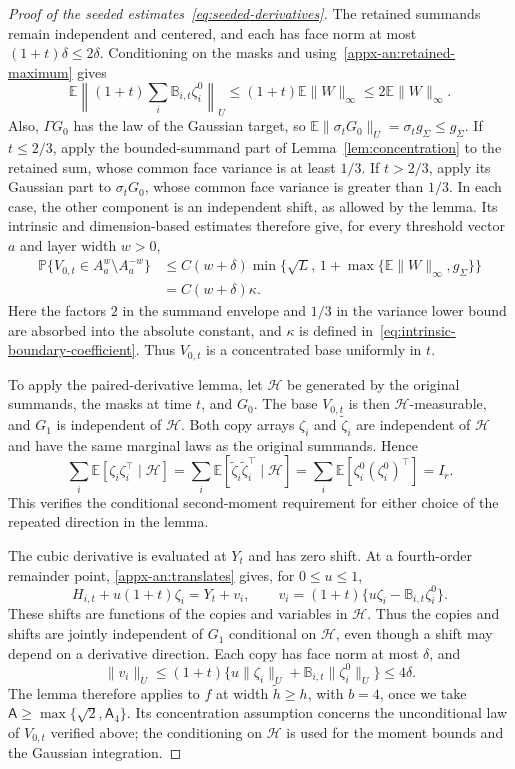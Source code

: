 \documentclass[11pt,letterpaper]{article}
\theoremstyle{remark}
\newcommand{\E}{\mathbb E}
\newcommand{\Pp}{\mathbb P}
\begin{document}
\begin{proof}[Proof of the seeded estimates~\eqref{eq:seeded-derivatives}]
The retained summands remain independent and centered, and each
has face norm at most $(1+t)\delta\le2\delta$. Conditioning on
the masks and using~\eqref{appx-an:retained-maximum} gives
\[
 \E\left\|(1+t)\sum_i\mathbb B_{i,t}\zeta_i^0\right\|_U
 \le(1+t)\E\|W\|_\infty\le2\E\|W\|_\infty.
\]
Also, $\Gamma G_0$ has the law of the Gaussian target, so
$\E\|\sigma_tG_0\|_U=\sigma_tg_\Sigma\le g_\Sigma$.
If $t\le2/3$, apply the bounded-summand part of
Lemma~\ref{lem:concentration} to the retained sum, whose common
face variance is at least $1/3$. If $t>2/3$, apply its Gaussian
part to $\sigma_tG_0$, whose common face variance is greater
than $1/3$. In each case, the other component is an independent
shift, as allowed by the lemma. Its intrinsic and
dimension-based estimates therefore give, for every threshold
vector $a$ and layer width $w>0$,
\[
 \begin{aligned}
 \Pp\{V_{0,t}\in A_a^w\setminus A_a^{-w}\}
 &\le C(w+\delta)
       \min\{\sqrt L,\,1+\max\{\E\|W\|_\infty,g_\Sigma\}\}\\
 &=C(w+\delta)\kappa.
 \end{aligned}
\]
Here the factors $2$ in the summand envelope and $1/3$ in the
variance lower bound are absorbed into the absolute constant,
and $\kappa$ is defined in~\eqref{eq:intrinsic-boundary-coefficient}.
Thus $V_{0,t}$ is a concentrated base uniformly in $t$.

To apply the paired-derivative lemma, let $\mathcal H$ be
generated by the original summands, the masks at time $t$, and
$G_0$. The base $V_{0,t}$ is then $\mathcal H$-measurable, and
$G_1$ is independent of $\mathcal H$. Both copy arrays
$\zeta_i$ and $\widetilde\zeta_i$ are independent of
$\mathcal H$ and have the same marginal laws as the original
summands. Hence
\[
 \sum_i\E[\zeta_i\zeta_i^\top\mid\mathcal H]
 =\sum_i\E[\widetilde\zeta_i\widetilde\zeta_i^\top
                     \mid\mathcal H]
 =\sum_i\E[\zeta_i^0(\zeta_i^0)^\top]=I_r.
\]
This verifies the conditional second-moment requirement for
either choice of the repeated direction in the lemma.

The cubic derivative is evaluated at $Y_t$ and has zero shift.
At a fourth-order remainder point, 
\eqref{appx-an:translates} gives, for $0\le u\le1$,
\[
 H_{i,t}+u(1+t)\zeta_i=Y_t+v_i,\qquad
 v_i=(1+t)\{u\zeta_i-\mathbb B_{i,t}\zeta_i^0\}.
\]
These shifts are functions of the copies and variables in
$\mathcal H$. Thus the copies and shifts are jointly independent
of $G_1$ conditional on $\mathcal H$, even though a shift may
depend on a derivative direction. Each copy has face norm at
most $\delta$, and
\[
 \|v_i\|_U
 \le(1+t)\{u\|\zeta_i\|_U
                  +\mathbb B_{i,t}\|\zeta_i^0\|_U\}
 \le4\delta.
\]
The lemma therefore applies to $f$ at width
$\widetilde h\ge h$, with $b=4$, once we take
$\mathsf A\ge\max\{\sqrt2,\mathsf A_4\}$. Its concentration
assumption concerns the unconditional law of $V_{0,t}$ verified
above; the conditioning on $\mathcal H$ is used for the moment
bounds and the Gaussian integration.


\end{proof}
\end{document}
